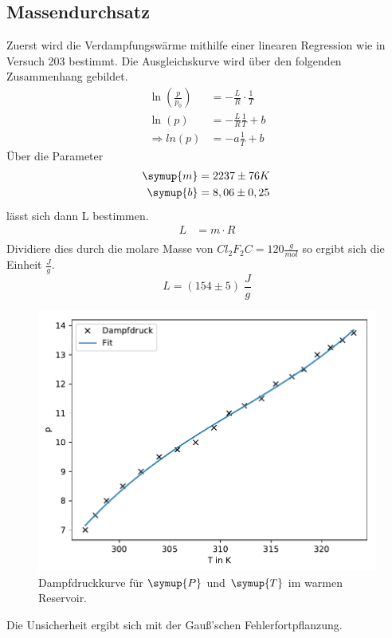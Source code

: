 {\subsection{Massendurchsatz}
Zuerst wird die Verdampfungswärme mithilfe einer linearen Regression wie in Versuch 203 bestimmt.
Die Ausgleichskurve wird über den folgenden Zusammenhang gebildet.
\begin{align*}
    \ln(\frac{p}{p_0})&= -\frac{L}{R}\cdot\frac{1}{T}\\
    \ln(p)&=-\frac{L}{R}\frac{1}{T}+b \\
    \Rightarrow ln(p)&=-a\frac{1}{T}+b    
\end{align*}
Über die Parameter
\begin{align*}
  \symup{m} &= 2237\pm76K \\
  \symup{b} &= 8,06\pm0,25 \:
\end{align*}
lässt sich dann L bestimmen.
\begin{align*}
    L &= m\cdot R\\
\end{align*}
Dividiere dies durch die molare Masse von $Cl_2F_2C=120\frac{g}{mol}$ 
so ergibt sich die Einheit $\frac{J}{g}$.
\begin{equation*}
    L=(154\pm5) \;\frac{J}{g}
\end{equation*}
\begin{figure}[H]
  \includegraphics{build/plot_L.pdf}
  \caption{Dampfdruckkurve für $\symup{P}$ und $\symup{T}$ im warmen Reservoir.}
  \label{fig:Dampfp}
\end{figure}
Die Unsicherheit ergibt sich mit der Gauß'schen Fehlerfortpflanzung.
}
